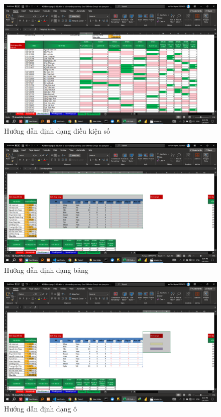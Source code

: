 \documentclass{article}
\begin{document}
\begin{figure}[H]
\centering
\includegraphics[scale = 0.15]{Video7/HuongDan/2.png}
\caption{Hướng dẫn   định dạng điều kiện số  }
\end{figure}


\begin{figure}[H]
\centering
\includegraphics[scale = 0.15]{Video7/HuongDan/3.png}
\caption{Hướng dẫn   định dạng bảng  }
\end{figure}


\begin{figure}[H]
\centering
\includegraphics[scale = 0.15]{Video7/HuongDan/4.png}
\caption{Hướng dẫn   định dạng ô  }
\end{figure}
\end{document}
